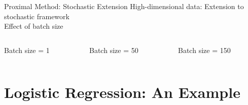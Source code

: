 \documentclass[10pt]{beamer}
\begin{document}
   \begin{frame}{Proximal Method: Stochastic Extension}
   High-dimensional data:
   Extension to stochastic framework\\
   \vspace{10pt}
   \alert{Effect of batch size}
   	\begin{columns}[T]
   		\hspace{-16pt}
   		\begin{column}{.3\textwidth}
   			\hspace{30pt} \scriptsize Batch size = 1
   			\vspace{10pt}
   			\resizebox{1.18\linewidth}{!}{}
   		\end{column}\hspace{-16pt}
   		\begin{column}{.3\textwidth}
   			\hspace{30pt} \scriptsize Batch size = 50
   			\vspace{10pt}
   			\resizebox{1.18\linewidth}{!}{}
   		\end{column}\hspace{-16pt}
   		\begin{column}{.3\textwidth}
   			\hspace{30pt} \scriptsize Batch size = 150
   			\vspace{10pt}
   			\resizebox{1.18\linewidth}{!}{}
   		\end{column}
   	\end{columns}
   \end{frame}

\section{Logistic Regression: An Example}

\end{document}
